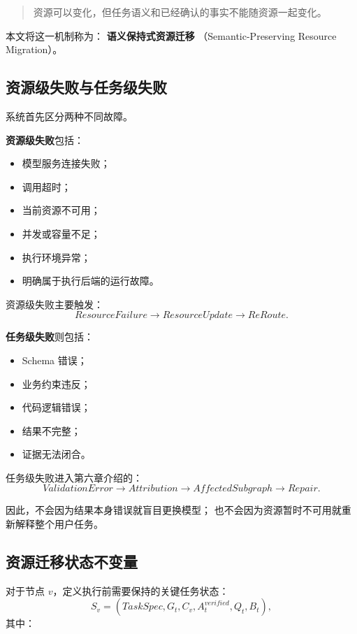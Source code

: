 \documentclass[UTF8,a4paper,12pt,oneside]{ctexbook}
\begin{document}
\begin{quote}
资源可以变化，但任务语义和已经确认的事实不能随资源一起变化。
\end{quote}

本文将这一机制称为：
\textbf{语义保持式资源迁移}
（Semantic-Preserving Resource Migration）。


\subsection{资源级失败与任务级失败}

系统首先区分两种不同故障。

\textbf{资源级失败}包括：

\begin{itemize}
    \item 模型服务连接失败；
    \item 调用超时；
    \item 当前资源不可用；
    \item 并发或容量不足；
    \item 执行环境异常；
    \item 明确属于执行后端的运行故障。
\end{itemize}

资源级失败主要触发：
\[
ResourceFailure
\rightarrow
ResourceUpdate
\rightarrow
ReRoute.
\]

\textbf{任务级失败}则包括：

\begin{itemize}
    \item Schema 错误；
    \item 业务约束违反；
    \item 代码逻辑错误；
    \item 结果不完整；
    \item 证据无法闭合。
\end{itemize}

任务级失败进入第六章介绍的：
\[
ValidationError
\rightarrow
Attribution
\rightarrow
AffectedSubgraph
\rightarrow
Repair.
\]

因此，不会因为结果本身错误就盲目更换模型；
也不会因为资源暂时不可用就重新解释整个用户任务。


\subsection{资源迁移状态不变量}

对于节点 $v$，定义执行前需要保持的关键任务状态：
\[
S_v=
(
TaskSpec,
G_t,
C_v,
A_t^{verified},
Q_t,
B_t
),
\]
其中：
\end{document}
